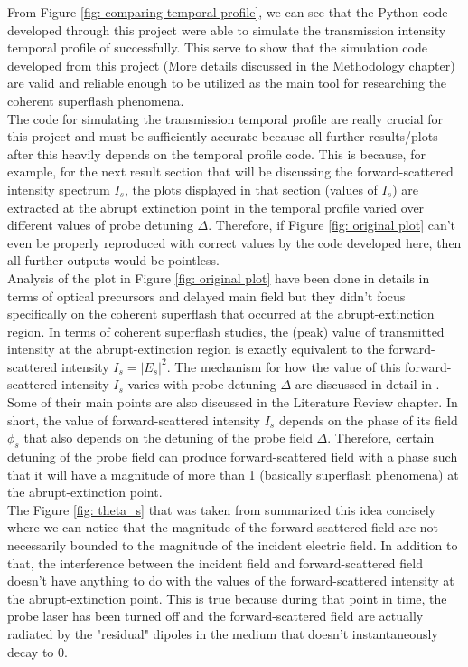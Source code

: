 From Figure \ref{fig: comparing temporal profile}, we can see that the Python code developed through this project were able to simulate the transmission intensity temporal profile of \cite{jeong2010slow} successfully. This serve to show that the simulation code developed from this project (More details discussed in the Methodology chapter) are valid and reliable enough to be utilized as the main tool for researching the coherent superflash phenomena.\\

The code for simulating the transmission temporal profile are really crucial for this project and must be sufficiently accurate because all further results/plots after this heavily depends on the temporal profile code. This is because, for example, for the next result section that will be discussing the forward-scattered intensity spectrum $I_{s}$, the plots displayed in that section (values of $I_{s}$) are extracted at the abrupt extinction point in the temporal profile varied over different values of probe detuning $\Delta$. Therefore, if Figure \ref{fig: original plot} can't even be properly reproduced with correct values by the code developed here, then all further outputs would be pointless.\\

Analysis of the plot in Figure \ref{fig: original plot} have been done in details in terms of optical precursors and delayed main field \cite{jeong2010slow} but they didn't focus specifically on the coherent superflash that occurred at the abrupt-extinction region. In terms of coherent superflash studies, the (peak) value of transmitted intensity at the abrupt-extinction region is exactly equivalent to the forward-scattered intensity $I_{s} = |E_{s}|^{2}$. The mechanism for how the value of this forward-scattered intensity $I_{s}$ varies with probe detuning $\Delta$ are discussed in detail in \cite{Chalony2011, Kwong2014, Kwong2017}. Some of their main points are also discussed in the Literature Review chapter. In short, the value of forward-scattered intensity $I_{s}$ depends on the phase of its field $\phi_{s}$ that also depends on the detuning of the probe field $\Delta$. Therefore, certain detuning of the probe field can produce forward-scattered field with a phase such that it will have a magnitude of more than 1 (basically superflash phenomena) at the abrupt-extinction point.\\

The Figure \ref{fig: theta_s} that was taken from \cite{Kwong2014} summarized this idea concisely where we can notice that the magnitude of the forward-scattered field are not necessarily bounded to the magnitude of the incident electric field. In addition to that, the interference between the incident field and forward-scattered field doesn't have anything to do with the values of the forward-scattered intensity at the abrupt-extinction point. This is true because during that point in time, the probe laser has been turned off and the forward-scattered field are actually radiated by the "residual" dipoles in the medium that doesn't instantaneously decay to $0$.\\

